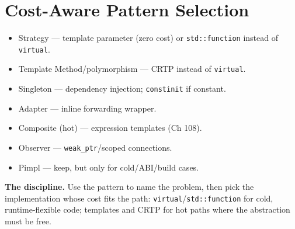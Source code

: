 \section{Cost-Aware Pattern Selection}
\begin{itemize}
\item Strategy --- template parameter (zero cost) or \texttt{std::function} instead of \texttt{virtual}.
\item Template Method/polymorphism --- CRTP instead of \texttt{virtual}.
\item Singleton --- dependency injection; \texttt{constinit} if constant.
\item Adapter --- inline forwarding wrapper.
\item Composite (hot) --- expression templates (Ch 108).
\item Observer --- \texttt{weak\_ptr}/scoped connections.
\item Pimpl --- keep, but only for cold/ABI/build cases.
\end{itemize}

\textbf{The discipline.} Use the pattern to name the problem, then pick the implementation whose cost fits the path: \texttt{virtual}/\texttt{std::function} for cold, runtime-flexible code; templates and CRTP for hot paths where the abstraction must be free.
